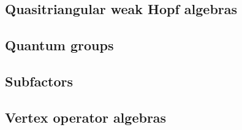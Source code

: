 \documentclass{article}
\theoremstyle{definition}
\newcommand{\0}{\left|0\right>}
\newcommand{\1}{\left|1\right>}
\numberwithin{figure}{section}
\begin{document}
\subsection{Quasitriangular weak Hopf algebras}

\subsection{Quantum groups}

\subsection{Subfactors}

\subsection{Vertex operator algebras}




\end{document}
